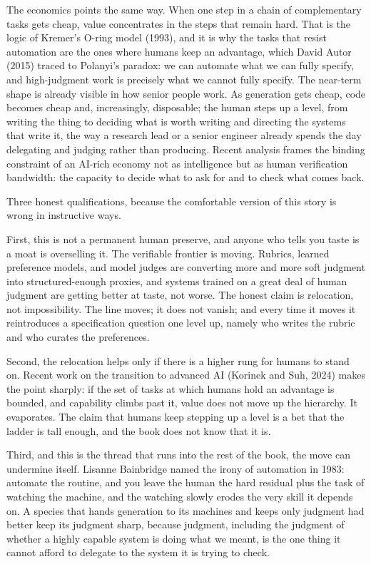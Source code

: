 The economics points the same way. When one step in a chain of complementary tasks gets cheap, value concentrates in the steps that remain hard. That is the logic of Kremer's O-ring model (1993), and it is why the tasks that resist automation are the ones where humans keep an advantage, which David Autor (2015) traced to Polanyi's paradox: we can automate what we can fully specify, and high-judgment work is precisely what we cannot fully specify. The near-term shape is already visible in how senior people work. As generation gets cheap, code becomes cheap and, increasingly, disposable; the human steps up a level, from writing the thing to deciding what is worth writing and directing the systems that write it, the way a research lead or a senior engineer already spends the day delegating and judging rather than producing. Recent analysis frames the binding constraint of an AI-rich economy not as intelligence but as human verification bandwidth: the capacity to decide what to ask for and to check what comes back.

Three honest qualifications, because the comfortable version of this story is wrong in instructive ways.

First, this is not a permanent human preserve, and anyone who tells you taste is a moat is overselling it. The verifiable frontier is moving. Rubrics, learned preference models, and model judges are converting more and more soft judgment into structured-enough proxies, and systems trained on a great deal of human judgment are getting better at taste, not worse. The honest claim is relocation, not impossibility. The line moves; it does not vanish; and every time it moves it reintroduces a specification question one level up, namely who writes the rubric and who curates the preferences.

Second, the relocation helps only if there is a higher rung for humans to stand on. Recent work on the transition to advanced AI (Korinek and Suh, 2024) makes the point sharply: if the set of tasks at which humans hold an advantage is bounded, and capability climbs past it, value does not move up the hierarchy. It evaporates. The claim that humans keep stepping up a level is a bet that the ladder is tall enough, and the book does not know that it is.

Third, and this is the thread that runs into the rest of the book, the move can undermine itself. Lisanne Bainbridge named the irony of automation in 1983: automate the routine, and you leave the human the hard residual plus the task of watching the machine, and the watching slowly erodes the very skill it depends on. A species that hands generation to its machines and keeps only judgment had better keep its judgment sharp, because judgment, including the judgment of whether a highly capable system is doing what we meant, is the one thing it cannot afford to delegate to the system it is trying to check.


